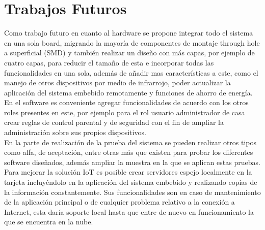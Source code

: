 \chapter{Trabajos Futuros}

Como trabajo futuro en cuanto al hardware se propone integrar todo el sistema en una sola board, migrando la mayoría de componentes de montaje through hole a superficial (SMD) y también realizar un diseño con más capas, por ejemplo de cuatro capas, para reducir el tamaño de esta e incorporar todas las funcionalidades en una sola, además de añadir mas características a este, como el manejo de otros dispositivos por medio de infrarrojo, poder actualizar la aplicación del sistema embebido remotamente y funciones de ahorro de energía.\\

En el software es conveniente agregar funcionalidades de acuerdo con los otros roles presentes en este, por ejemplo para el rol usuario administrador de casa crear reglas de control parental y de seguridad con el fin de ampliar la administración sobre sus propios dispositivos.\\

En la parte de realización de la prueba del sistema se pueden realizar otros tipos como alfa, de aceptación, entre otras más que existen para probar los diferentes software diseñados, además ampliar la muestra en la que se aplican estas pruebas.\\

Para mejorar la solución IoT es posible crear servidores espejo localmente en la tarjeta incluyéndolo en la aplicación del sistema embebido y realizando copias de la información constantemente. Sus funcionalidades son en caso de mantenimiento de la aplicación principal o de cualquier problema relativo a la conexión a Internet, esta daría soporte local hasta que entre de nuevo en funcionamiento la que se encuentra en la nube.\\
